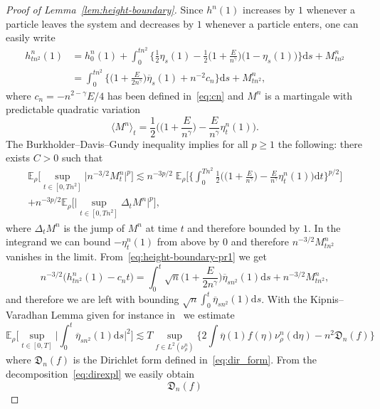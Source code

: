 \documentclass[AHL,Unicode,longabstracts]{cedram}
\renewcommand{\bar}{\overline}
\renewcommand{\ge}{\geqslant}
\newcommand*{\dd}{\mathrm{d}}
\newcommand*{\ds}{\dd s}
\newcommand*{\dt}{\dd t}
\begin{document}
\begin{proof}[Proof of Lemma~\ref{lem:height-boundary}]
Since $h^n(1)$ increases by $1$ whenever a particle leaves the system and decreases by $1$ whenever a particle enters, one can easily write
\begin{align}\label{eq:height-boundary-pr1}
\nonumber
h^n_{{tn^2}} (1) & = h_0^n(1) + \int_0^{{tn^2}} \bigg\{ \frac12 \eta_{{s}} (1) - \frac12 \Big(1 +
\frac{E}{n^{\gamma}} \Big) \big(1-\eta_{{s}}(1)\big) \bigg\} \ds + M^n_{{tn^2}}\\
& = \int_0^{{tn^2}} \bigg\{ \Big(1 +
\frac{E}{2n^{\gamma}} \Big) \bar\eta_{{s}} (1) + {n^{-2}} c_n \bigg\} \ds + M^n_{{tn^2}},
\end{align}
where $c_n=-n^{2-\gamma}E/4$ has been defined in~\eqref{eq:cn} and $M^n$ is a martingale with predictable quadratic variation
\[
\langle M^n \rangle_t = \frac{{1}}{2} \bigg(\Big(1 +
\frac{E}{n^{\gamma}} \Big) - \frac{E}{n^{\gamma}} \eta^n_{{t}} (1) \bigg).
\]
The Burkholder--Davis--Gundy inequality implies for all $p \ge 1$ the following: there exists $C>0$ such that
\begin{multline*}
\mathbb{E}_\rho \Big[\sup_{t \in [0,{{Tn^2}}]} \big| n^{- 3 / 2} M^n_t \big|^p\Big] \lesssim n^{- 3 p / 2} \; \mathbb{E}_\rho \bigg[\bigg\{ \int_0^{{Tn^2}} \frac{{1}}{2} \bigg(\Big(1 +
\frac{E}{n^{\gamma}} \Big) - \frac{E}{n^{\gamma}} \eta^n_{{t}} (1) \bigg) \dt \bigg\}^{p / 2} \bigg]\\
+ n^{- 3 p / 2} \mathbb{E}_\rho \Big[\Big| \sup_{t \in [0,{{Tn^2}}]} \Delta_t M^n \Big|^p\Big],
\end{multline*}
where $\Delta_t M^n$ is the jump of $M^n$ at time $t$ and therefore bounded by $1$. In the integrand we can bound $-\eta^n_{{t}} (1)$ from above by $0$ and therefore $n^{-3/2}M_{{tn^2}}^n$ vanishes in the limit. From~\eqref{eq:height-boundary-pr1} we get
\[
n^{-3/2}\big(h_{{tn^2}}^n(1)-c_nt\big) = \int_0^t \sqrt n \Big(1 +
\frac{E}{2n^{\gamma}} \Big) \bar\eta_{sn^2} (1) \ds + n^{-3/2} M_{{tn^2}}^n,
\]
and therefore we are left with bounding $\sqrt n \int_0^t \bar\eta_{sn^2} (1)\ds$. With the Kipnis--Varadhan Lemma given for instance in~\cite[Proposition~A.1.6.1]{kl} we estimate
\[
\mathbb{E}_{\rho} \Bigg[\sup_{t \in [0,T]} \bigg| \int_0^t
\bar\eta_{sn^2} (1) \ds \bigg|^2 \Bigg] \lesssim T \sup_{f\in L^2(\nu^n_\rho)} \bigg\{ 2
\int \bar\eta (1) f(\eta) \nu^n_\rho(\dd\eta) - n^2\mathfrak{D}_n(f) \bigg\}
\]
where $\mathfrak{D}_n(f)$ is the Dirichlet form defined in~\eqref{eq:dir_form}. From the decomposition~\eqref{eq:direxpl} we easily obtain
\[
\mathfrak{D}_n(f)
\]
\end{proof}
\end{document}
